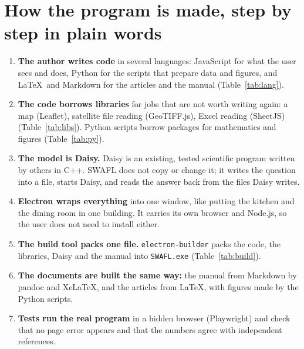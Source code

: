 \section{How the program is made, step by step in plain words}
\begin{enumerate}[leftmargin=1.5em]
\item \textbf{The author writes code} in several languages: JavaScript for what the user sees and does, Python for the scripts that prepare data and figures, and \LaTeX\ and Markdown for the articles and the manual (Table~\ref{tab:lang}).
\item \textbf{The code borrows libraries} for jobs that are not worth writing again: a map (Leaflet), satellite file reading (GeoTIFF.js), Excel reading (SheetJS) (Table~\ref{tab:libs}). Python scripts borrow packages for mathematics and figures (Table~\ref{tab:py}).
\item \textbf{The model is Daisy.} Daisy is an existing, tested scientific program written by others in C++. SWAFL does not copy or change it; it writes the question into a file, starts Daisy, and reads the answer back from the files Daisy writes.
\item \textbf{Electron wraps everything} into one window, like putting the kitchen and the dining room in one building. It carries its own browser and Node.js, so the user does not need to install either.
\item \textbf{The build tool packs one file.} \texttt{electron-builder} packs the code, the libraries, Daisy and the manual into \texttt{SWAFL.exe} (Table~\ref{tab:build}).
\item \textbf{The documents are built the same way:} the manual from Markdown by pandoc and XeLaTeX, and the articles from \LaTeX, with figures made by the Python scripts.
\item \textbf{Tests run the real program} in a hidden browser (Playwright) and check that no page error appears and that the numbers agree with independent references.
\end{enumerate}

